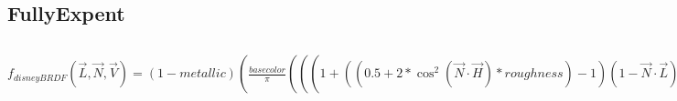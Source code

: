 \documentclass[cyan,normal,en]{elegantnote}
\begin{document}
\subsection{FullyExpent}
$
f_{disneyBRDF}(\vec{L},\vec{N},\vec{V})=(1-metallic)(\frac{basecolor}{\pi}(((1+((0.5+2*\cos^2(\vec{N}\cdot\vec{H})*roughness)-1)(1-\vec{N}\cdot\vec{L})^5)(1+((0.5+2*\cos^2(\vec{N}\cdot\vec{H})*roughness)-1)(1-\vec{N}\cdot\vec{V})^5))*(1-subsurface)+(1.25(((1+(\cos^2(\vec{N}\cdot\vec{H})*roughness-1)(1-\vec{N}\cdot\vec{L})^5)(1+(\cos^2(\vec{N}\cdot\vec{H})*roughness-1)(1-\vec{N}\cdot\vec{V})^5))(\frac{1}{\vec{N}\cdot\vec{L}+\vec{N}\cdot\vec{V}}-0.5)+0.5))*subsurface)+((white*(1-sheenTint)+\frac{baseColor}{lum(baseColor)}*sheenTint)*sheen*(1-\vec{N}\cdot\vec{H})^5))+(1-metallic)*0.08specular((1-specularTint)white+specularTint\frac{baseColor}{lum(baseColor)})+metallic*baseColor+(1-(1-metallic)*0.08specular((1-specularTint)white+specularTint\frac{baseColor}{lum(baseColor)})+metallic*baseColor)(1-\vec{N}\cdot\vec{H})^5*\frac{1}{\vec{N}\cdot\vec{V}+\sqrt{\frac{1+roughness}{2}^4+(\vec{N}\cdot\vec{V})^2-\frac{1+roughness}{2}^2(\vec{N}\cdot\vec{V})}}*(\frac{1}{\pi*roughness^4*((\frac{\vec{H}\cdot\vec{X}}{roughness^2\sqrt{1-0.9*anisotropic}}+\frac{\vec{H}\cdot\vec{Y}}{roughness^2\sqrt{1-0.9*anisotropic}})^2+(\vec{N}\cdot\vec{H})^2)^2})/(4*\vec{N}\cdot\vec{L}*\vec{N}\cdot\vec{V})+\frac{clearcoat}{4}*(0.04+0.96*(1-\vec{V}\cdot\vec{H})^5)/(\vec{N}\cdot\vec{V}+\sqrt{(0.5+roughness*0.5)^4+({\vec{N}\cdot\vec{V})^4-(0.5+roughness*0.5)^2*({\vec{N}\cdot\vec{V})^2}}})*((0.1-0.09clearCoatGloss)^2-1)/(2\pi\ln(0.1-0.09clearCoatGloss)*((0.1-0.09clearCoatGloss)^2*(\vec{N}\cdot\vec{V})^2+(1-(\vec{N}\cdot\vec{H})^2))))/(4*\vec{N}\cdot\vec{L}*\vec{N}\cdot\vec{V})
$
\end{document}
